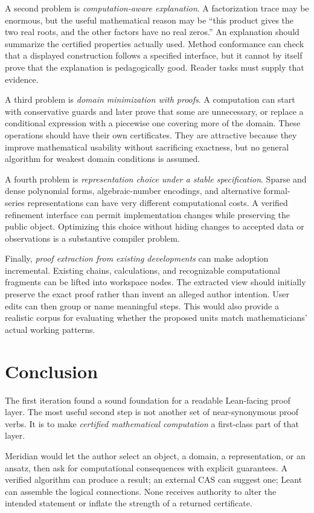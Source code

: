 \documentclass[11pt,a4paper]{article}
\newcommand{\code}[1]{\texttt{\detokenize{#1}}}
\theoremstyle{remark}
\begin{document}
A second problem is \emph{computation-aware explanation}. A factorization trace
may be enormous, but the useful mathematical reason may be ``this product gives
the two real roots, and the other factors have no real zeros.'' An explanation
should summarize the certified properties actually used. Method conformance can
check that a displayed construction follows a specified interface, but it cannot
by itself prove that the explanation is pedagogically good. Reader tasks must
supply that evidence.

A third problem is \emph{domain minimization with proofs}. A computation can start
with conservative guards and later prove that some are unnecessary, or replace a
conditional expression with a piecewise one covering more of the domain. These
operations should have their own certificates. They are attractive because they
improve mathematical usability without sacrificing exactness, but no general
algorithm for weakest domain conditions is assumed.

A fourth problem is \emph{representation choice under a stable specification}.
Sparse and dense polynomial forms, algebraic-number encodings, and alternative
formal-series representations can have very different computational costs.
A verified refinement interface can permit implementation changes while
preserving the public object. Optimizing this choice without hiding changes to
accepted data or observations is a substantive compiler problem.

Finally, \emph{proof extraction from existing developments} can make adoption
incremental. Existing \code{have} chains, calculations, and recognizable
computational fragments can be lifted into workspace nodes. The extracted view
should initially preserve the exact proof rather than invent an alleged author
intention. User edits can then group or name meaningful steps. This would also
provide a realistic corpus for evaluating whether the proposed units match
mathematicians' actual working patterns.

\section{Conclusion}
The first iteration found a sound foundation for a readable Lean-facing proof
layer. The most useful second step is not another set of near-synonymous proof
verbs. It is to make \emph{certified mathematical computation} a first-class part
of that layer.

Meridian would let the author select an object, a domain, a representation, or an
ansatz, then ask for computational consequences with explicit guarantees. A
verified algorithm can produce a result; an external CAS can suggest one; Leant
can assemble the logical connections. None receives authority to alter the
intended statement or inflate the strength of a returned certificate.
\end{document}
